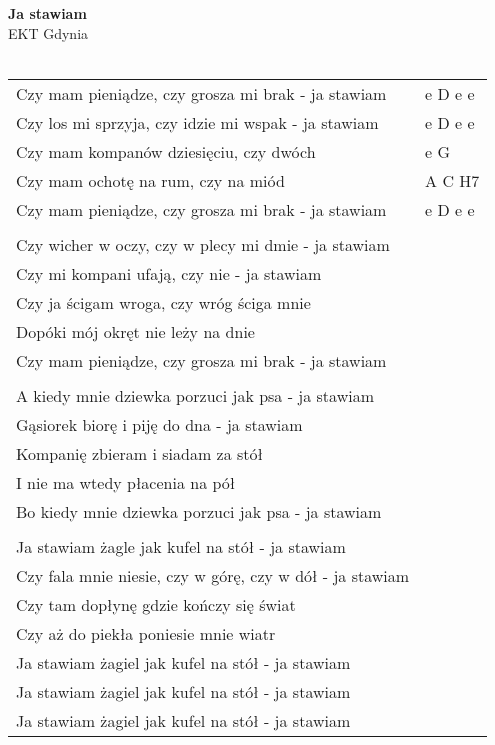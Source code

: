 \documentclass[a5paper]{article}
\begin{document}


\noindent
\fontsize{12pt}{15pt}\selectfont
\textbf{Ja stawiam} \\
\fontsize{8pt}{10pt}\selectfont
EKT Gdynia \\ \\
\fontsize{10pt}{12pt}\selectfont
{}
\begin{tabular}{@{}p{9.00cm}p{3cm}@{}}
\noindent
Czy mam pieniądze, czy grosza mi brak - ja stawiam & e D e e \\
Czy los mi sprzyja, czy idzie mi wspak - ja stawiam & e D e e \\
Czy mam kompanów dziesięciu, czy dwóch & e G \\
Czy mam ochotę na rum, czy na miód & A C H7 \\
Czy mam pieniądze, czy grosza mi brak - ja stawiam & e D e e \\ \\

Czy wicher w oczy, czy w plecy mi dmie - ja stawiam \\
Czy mi kompani ufają, czy nie - ja stawiam \\
Czy ja ścigam wroga, czy wróg ściga mnie \\
Dopóki mój okręt nie leży na dnie \\
Czy mam pieniądze, czy grosza mi brak - ja stawiam \\ \\

A kiedy mnie dziewka porzuci jak psa - ja stawiam \\
Gąsiorek biorę i piję do dna - ja stawiam \\
Kompanię zbieram i siadam za stół \\
I nie ma wtedy płacenia na pół \\
Bo kiedy mnie dziewka porzuci jak psa - ja stawiam \\ \\

Ja stawiam żagle jak kufel na stół - ja stawiam \\
Czy fala mnie niesie, czy w górę, czy w dół - ja stawiam \\
Czy tam dopłynę gdzie kończy się świat \\
Czy aż do piekła poniesie mnie wiatr \\
Ja stawiam żagiel jak kufel na stół - ja stawiam \\
Ja stawiam żagiel jak kufel na stół - ja stawiam \\
Ja stawiam żagiel jak kufel na stół - ja stawiam
\end{tabular}
\end{document}
